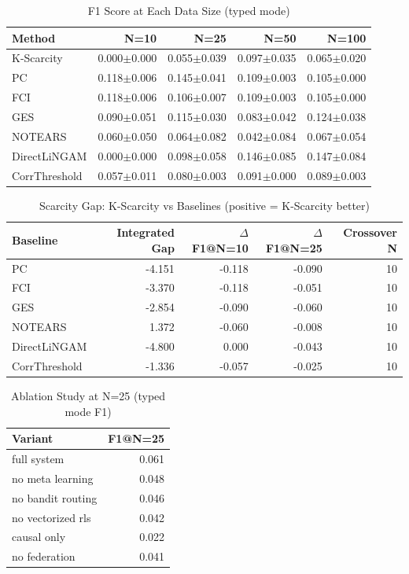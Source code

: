 \begin{table}[htbp]
\centering
\caption{F1 Score at Each Data Size (typed mode)}
\label{tab:f1_sweep}
\begin{tabular}{lrrrr}
\toprule
Method & N=10 & N=25 & N=50 & N=100 \\
\midrule
K-Scarcity & 0.000$\pm$0.000 & 0.055$\pm$0.039 & 0.097$\pm$0.035 & 0.065$\pm$0.020 \\
\midrule
PC & 0.118$\pm$0.006 & 0.145$\pm$0.041 & 0.109$\pm$0.003 & 0.105$\pm$0.000 \\
FCI & 0.118$\pm$0.006 & 0.106$\pm$0.007 & 0.109$\pm$0.003 & 0.105$\pm$0.000 \\
GES & 0.090$\pm$0.051 & 0.115$\pm$0.030 & 0.083$\pm$0.042 & 0.124$\pm$0.038 \\
NOTEARS & 0.060$\pm$0.050 & 0.064$\pm$0.082 & 0.042$\pm$0.084 & 0.067$\pm$0.054 \\
DirectLiNGAM & 0.000$\pm$0.000 & 0.098$\pm$0.058 & 0.146$\pm$0.085 & 0.147$\pm$0.084 \\
CorrThreshold & 0.057$\pm$0.011 & 0.080$\pm$0.003 & 0.091$\pm$0.000 & 0.089$\pm$0.003 \\
\bottomrule
\end{tabular}
\end{table}

\begin{table}[htbp]
\centering
\caption{Scarcity Gap: K-Scarcity vs Baselines (positive = K-Scarcity better)}
\label{tab:scarcity_gap}
\begin{tabular}{lrrrr}
\toprule
Baseline & Integrated Gap & $\Delta$F1@N=10 & $\Delta$F1@N=25 & Crossover N \\
\midrule
PC & -4.151 & -0.118 & -0.090 & 10 \\
FCI & -3.370 & -0.118 & -0.051 & 10 \\
GES & -2.854 & -0.090 & -0.060 & 10 \\
NOTEARS & 1.372 & -0.060 & -0.008 & 10 \\
DirectLiNGAM & -4.800 & 0.000 & -0.043 & 10 \\
CorrThreshold & -1.336 & -0.057 & -0.025 & 10 \\
\bottomrule
\end{tabular}
\end{table}

\begin{table}[htbp]
\centering
\caption{Ablation Study at N=25 (typed mode F1)}
\label{tab:ablation}
\begin{tabular}{lr}
\toprule
Variant & F1@N=25 \\
\midrule
full system & 0.061 \\
no meta learning & 0.048 \\
no bandit routing & 0.046 \\
no vectorized rls & 0.042 \\
causal only & 0.022 \\
no federation & 0.041 \\
\bottomrule
\end{tabular}
\end{table}